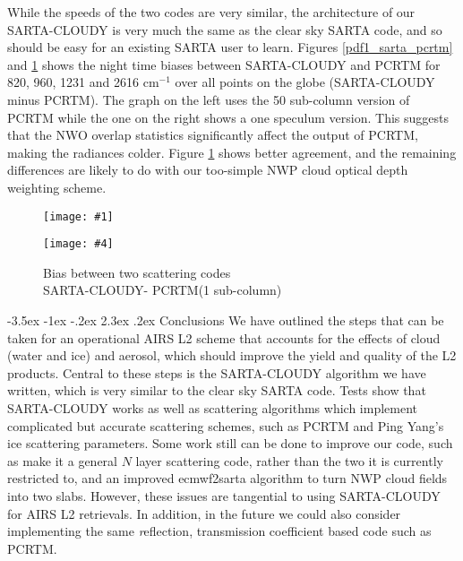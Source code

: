 \documentclass[11pt]{article}
\makeatletter
\newcommand{\sa}{\textsf{SARTA}\xspace}
\newcommand{\sasc}{\textsf{SARTA-CLOUDY}\xspace}
\newcommand{\pcrtm}{\textsf{PCRTM}\xspace}
\newcommand{\ecmwfXsarta}{\textsf{ecmwf2sarta}\xspace}
\newcommand{\dfigure}[6]
{
\begin{figure}
  \begin{minipage}[t]{0.47\textwidth}
  \centering
  \texttt{[image: \#1]}
   \caption{#2}  \label{#3}
  \end{minipage}
  \hfil
  \begin{minipage}[t]{0.47\linewidth}
  \centering
  \texttt{[image: \#4]}
   \caption{#5}  \label{#6}
  \end{minipage}
\end{figure}
}
\newcommand{\wn}{cm$^{-1}$\xspace}
\renewcommand{\section}{\@startsection {section}{1}{\z@}%
                                   {-3.5ex \@plus -1ex \@minus -.2ex}%
                                   {2.3ex \@plus.2ex}%
                                   {\reset@font\large\bfseries}}
\makeatother
\begin{document}
While the speeds of the two codes are very similar, the architecture
of our \sasc is very much the same as the clear sky \sa code, and so
should be easy for an existing \sa user to learn. Figures \ref{pdf1_sarta_pcrtm}
and \ref{pdf2_sarta_pcrtm} shows the night time biases between \sasc
and \pcrtm for 820, 960, 1231 and 2616 \wn over all points on the
globe (\sasc minus \pcrtm). The graph on the left uses the 50 sub-column
version of \pcrtm while the one on the right shows a one speculum
version.  This suggests that the NWO overlap statistics significantly
affect the output of \pcrtm, making the radiances colder.  Figure
\ref{pdf2_sarta_pcrtm} shows better agreement, and the remaining
differences are likely to do with our too-simple NWP cloud optical depth
weighting scheme.

\dfigure{Figs/pcrtm_calc_vs_sarta_calc_histV1.jpg}{Bias between two scattering codes \\
  \sasc - \pcrtm (50 sub-columns)}{pdf1_sarta_pcrtm}{Figs/pcrtm_calc_vs_sarta_calc_histV2.jpg}{Bias between two
  scattering codes \\  \sasc - \pcrtm (1 sub-column)}{pdf2_sarta_pcrtm}


\section{Conclusions}
We have outlined the steps that can be taken for an operational AIRS L2 scheme that 
accounts for the effects of cloud (water and ice) and aerosol, which should improve 
the yield and quality of the L2 products. Central to these steps is the \sasc 
algorithm we have written, which is very similar to the clear sky \sa code. 
Tests show that \sasc works as well as scattering algorithms which implement 
complicated but accurate scattering schemes, such as \pcrtm and Ping Yang's ice 
scattering parameters. Some work still can be done to improve our code, such as make 
it a general $N$ layer scattering code, rather than the two it is currently restricted
to, and an improved \ecmwfXsarta algorithm to turn NWP cloud fields into two slabs. 
However, these issues are tangential to using \sasc for AIRS L2 retrievals. In 
addition, in the future we could also consider implementing the same {\emph reflection,
transmission} coefficient based code such as \pcrtm.


% 

% 
\end{document}
